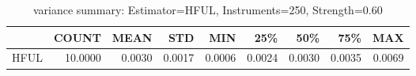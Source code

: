 \begin{table}[ht]
\centering
\caption{variance summary: Estimator=HFUL, Instruments=250, Strength=0.60}
\begin{tabular}{lrrrrrrrr}
\toprule
 & COUNT & MEAN & STD & MIN & 25\% & 50\% & 75\% & MAX \\
\midrule
HFUL & 10.0000 & 0.0030 & 0.0017 & 0.0006 & 0.0024 & 0.0030 & 0.0035 & 0.0069 \\
\bottomrule
\end{tabular}
\end{table}
